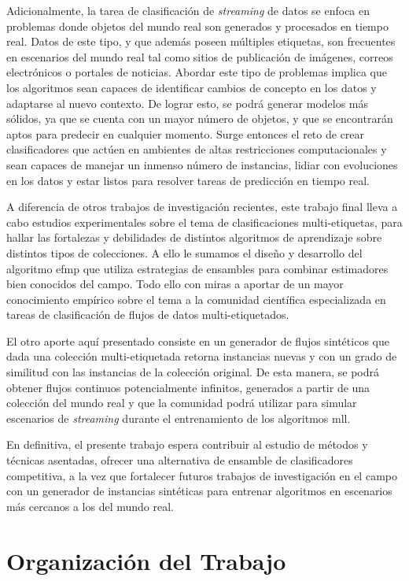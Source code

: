 Adicionalmente, la tarea de clasificación de \textit{streaming} de datos se
enfoca en problemas donde objetos del mundo real son generados y procesados en
tiempo real. Datos de este tipo, y que además poseen múltiples etiquetas, son
frecuentes en escenarios del mundo real tal como sitios de publicación de
imágenes, correos electrónicos o portales de noticias. Abordar este tipo de
problemas implica que los algoritmos sean capaces de identificar cambios de
concepto en los datos y adaptarse al nuevo contexto. De lograr esto, se podrá
generar modelos más sólidos, ya que se cuenta con un mayor número de objetos, y
que se encontrarán aptos para predecir en cualquier momento. Surge entonces el
reto de crear clasificadores que actúen en ambientes de altas restricciones
computacionales y sean capaces de manejar un inmenso número de instancias,
lidiar con evoluciones en los datos y estar listos para resolver tareas de
predicción en tiempo real.

A diferencia de otros trabajos de investigación recientes, este trabajo final
lleva a cabo estudios experimentales sobre el tema de clasificaciones
multi-etiquetas, para hallar las fortalezas y debilidades de distintos
algoritmos de aprendizaje sobre distintos tipos de colecciones. A ello le
sumamos el diseño y desarrollo del algoritmo \acrshort{efmp} que utiliza
estrategias de ensambles para combinar estimadores bien conocidos del campo.
Todo ello con miras a aportar de un mayor conocimiento empírico sobre el tema a
la comunidad científica especializada en tareas de clasificación de flujos de
datos multi-etiquetados.

El otro aporte aquí presentado consiste en un generador de flujos sintéticos que
dada una colección multi-etiquetada retorna instancias nuevas y con un grado de
similitud con las instancias de la colección original. De esta manera, se podrá
obtener flujos continuos potencialmente infinitos, generados a partir de una
colección del mundo real y que la comunidad podrá utilizar para simular
escenarios de \textit{streaming} durante el entrenamiento de los algoritmos
\acrshort{mll}.

En definitiva, el presente trabajo espera contribuir al estudio de métodos y
técnicas asentadas, ofrecer una alternativa de ensamble de clasificadores
competitiva, a la vez que fortalecer futuros trabajos de investigación en el
campo con un generador de instancias sintéticas para entrenar algoritmos en
escenarios más cercanos a los del mundo real.

\section{Organización del Trabajo}

